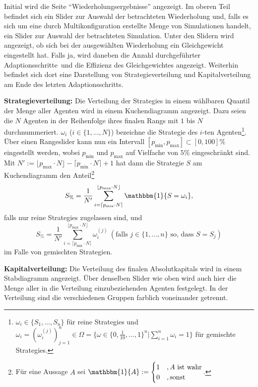 \documentclass[parskip=full,11pt]{scrartcl}
\def\adapt{Adaptionsschritt}
\def\adapts{Adaptionsschritte}
\begin{document}
Initial wird die Seite \enquote{Wiederholungsergebnisse} angezeigt. Im oberen Teil befindet sich ein Slider zur Auswahl der betrachteten Wiederholung und, falls es sich um eine durch Multikonfiguration erstellte Menge von Simulationen handelt, ein Slider zur Auswahl der betrachteten Simulation. Unter den Slidern wird angezeigt, ob sich bei der ausgewählten Wiederholung ein Gleichgewicht eingestellt hat. Falls ja, wird daneben die Anzahl durchgeführter \adapts\ und die \Gls{Effizienz} des Gleichgewichtes angezeigt. Weiterhin befindet sich dort eine Darstellung von Strategieverteilung und Kapitalverteilung am Ende des letzten \adapt s.

\textbf{Strategieverteilung:}
Die Verteilung der \Glspl{Strategie} in einem wählbaren Quantil der Menge aller Agenten wird in einem Kuchendiagramm angezeigt. Dazu seien die \(N\) Agenten in der Reihenfolge ihres finalen Rangs mit \(1\) bis \(N\) durchnummeriert. \(\omega_i\) (\(i \in \{1,...,N\}\)) bezeichne die \Gls{Strategie} des \(i\)-ten Agenten\footnote{\(\omega_i \in \{S_1,...,S_n\}\) für reine \Glspl{Strategie} und \(\omega_i = (\omega_i^{(j)})_{j=1}^n \in \Omega = \{\omega \in \{0,\frac{1}{10},...,1\}^n | \sum_{i=1}^n \omega_i = 1\}\) für \glspl{gemischte Strategie}.}. Über einen Rangeslider kann nun ein Intervall \([p_\text{min},p_\text{max}] \subset [0,100]\%\) eingestellt werden, wobei \(p_\text{min}\) und \(p_\text{max}\) auf Vielfache von \(5\%\) eingeschränkt sind. Mit \(N' := \lfloor p_\text{max} \cdot N \rfloor - \lceil p_\text{min} \cdot N \rceil + 1\) hat dann die \Gls{Strategie} \(S\) am Kuchendiagramm den Anteil\footnote{Für eine Aussage \(A\) sei \(\mathbbm{1}\{A\} := \begin{cases} 1 & , A \text{ ist wahr} \\ 0 &, \text{sonst}\end{cases}\).}
\[
S_\% = \frac{1}{N'} \sum_{i=\lceil p_\text{min} \cdot N \rceil}^{\lfloor p_\text{max} \cdot N \rfloor} \mathbbm{1}\{S = \omega_i\},
\]
falls nur reine \Glspl{Strategie} zugelassen sind, und
\[
S_\% = \frac{1}{N'} \sum_{i=\lceil p_\text{min} \cdot N \rceil}^{\lfloor p_\text{max} \cdot N \rfloor} \omega_i^{(j)}  \ (\text{falls } j \in \{1,...,n\} \text{ so, dass } S = S_j)
\]
im Falle von gemischten Strategien.

\textbf{Kapitalverteilung:}
Die Verteilung des finalen Absolutkapitals wird in einem Stabdiagramm angezeigt. Über denselben Slider wie oben wird auch hier die Menge aller in die Verteilung einzubeziehenden Agenten festgelegt. In der Verteilung sind die verschiedenen Gruppen farblich voneinander getrennt.
\end{document}
